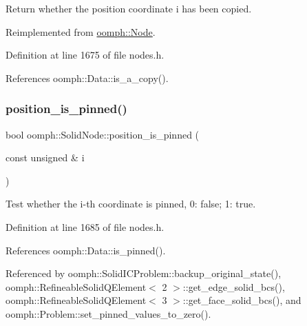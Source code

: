Return whether the position coordinate i has been copied. 



Reimplemented from \hyperlink{classoomph_1_1Node_a0e1ad244c2b109fb54a2fa6430d6ad5b}{oomph\+::\+Node}.



Definition at line 1675 of file nodes.\+h.



References oomph\+::\+Data\+::is\+\_\+a\+\_\+copy().

\mbox{\label{classoomph_1_1SolidNode_afd8204156be2ff0fa40834ca35daf243}} 
\subsubsection{\texorpdfstring{position\+\_\+is\+\_\+pinned()}{position\_is\_pinned()}\hspace{0.1cm}{\footnotesize\ttfamily [1/2]}}
{\footnotesize\ttfamily bool oomph\+::\+Solid\+Node\+::position\+\_\+is\+\_\+pinned (\begin{DoxyParamCaption}\item[{const unsigned \&}]{i }\end{DoxyParamCaption})\hspace{0.3cm}{\ttfamily [inline]}}



Test whether the i-\/th coordinate is pinned, 0\+: false; 1\+: true. 



Definition at line 1685 of file nodes.\+h.



References oomph\+::\+Data\+::is\+\_\+pinned().



Referenced by oomph\+::\+Solid\+I\+C\+Problem\+::backup\+\_\+original\+\_\+state(), oomph\+::\+Refineable\+Solid\+Q\+Element$<$ 2 $>$\+::get\+\_\+edge\+\_\+solid\+\_\+bcs(), oomph\+::\+Refineable\+Solid\+Q\+Element$<$ 3 $>$\+::get\+\_\+face\+\_\+solid\+\_\+bcs(), and oomph\+::\+Problem\+::set\+\_\+pinned\+\_\+values\+\_\+to\+\_\+zero().

\mbox{\label{classoomph_1_1SolidNode_af7254744691474f94df8ae3f4b75da38}} 
